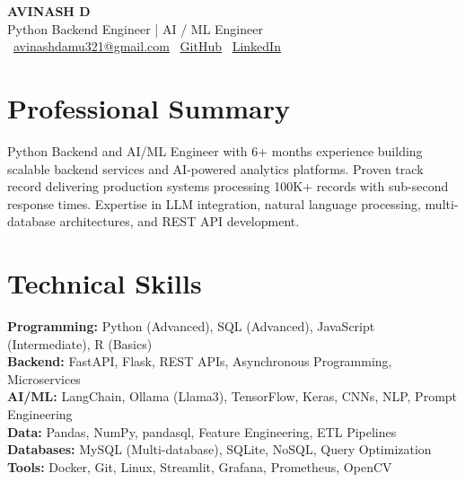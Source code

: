 \documentclass[letterpaper,10.5pt]{article}
\begin{document}
\begin{center}
    {\Large \textbf{AVINASH D}} \\
    Python Backend Engineer \;|\; AI / ML Engineer \\
    \faEnvelope\ \href{mailto:avinashdamu321@gmail.com}{avinashdamu321@gmail.com} \quad
    \faGithub\ \href{https://github.com/avinashdamu321-ops}{GitHub} \quad
    \faLinkedin\ \href{https://www.linkedin.com/in/damuavinash/}{LinkedIn}
\end{center}

\section{Professional Summary}
Python Backend and AI/ML Engineer with 6+ months experience building scalable backend services and AI-powered analytics platforms. Proven track record delivering production systems processing 100K+ records with sub-second response times. Expertise in LLM integration, natural language processing, multi-database architectures, and REST API development.

\section{Technical Skills}
\textbf{Programming:} Python (Advanced), SQL (Advanced), JavaScript (Intermediate), R (Basics) \\
\textbf{Backend:} FastAPI, Flask, REST APIs, Asynchronous Programming, Microservices \\
\textbf{AI/ML:} LangChain, Ollama (Llama3), TensorFlow, Keras, CNNs, NLP, Prompt Engineering \\
\textbf{Data:} Pandas, NumPy, pandasql, Feature Engineering, ETL Pipelines \\
\textbf{Databases:} MySQL (Multi-database), SQLite, NoSQL, Query Optimization \\
\textbf{Tools:} Docker, Git, Linux, Streamlit, Grafana, Prometheus, OpenCV

\end{document}
